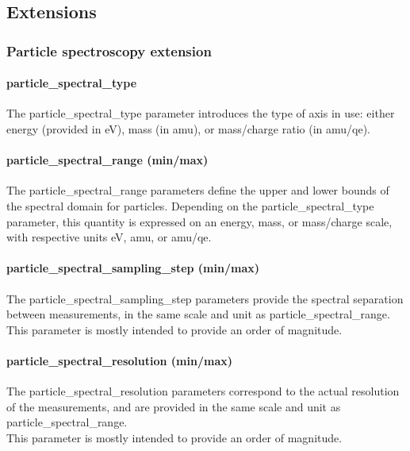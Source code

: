 \documentclass[11pt,a4paper]{ivoa}
\begin{document}
\subsection{Extensions}

\subsubsection{Particle spectroscopy extension}

\paragraph{particle\_spectral\_type}

The particle\_spectral\_type parameter introduces the type of axis in use: either energy (provided in eV), mass (in amu), or mass/charge ratio (in amu/qe).

\paragraph{particle\_spectral\_range (min/max)}

The particle\_spectral\_range parameters define the upper and lower bounds of the spectral domain for particles. Depending on the particle\_spectral\_type parameter, this quantity is expressed on an energy, mass, or mass/charge scale, with respective units eV, amu, or amu/qe.

\paragraph{particle\_spectral\_sampling\_step (min/max)}

The particle\_spectral\_sampling\_step parameters provide the spectral separation between measurements, in the same scale and unit as particle\_spectral\_range.\\This parameter is mostly intended to provide an order of magnitude.

\paragraph{particle\_spectral\_resolution (min/max)}

The particle\_spectral\_resolution parameters correspond to the actual resolution of the measurements, and are provided in the same scale and unit as particle\_spectral\_range. \\This parameter is mostly intended to provide an order of magnitude.
\end{document}
